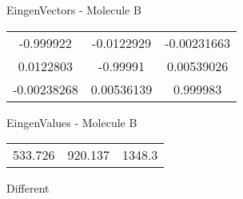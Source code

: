 \begin{multicols}{2}
\begin{center}
\vtab
 EingenVectors - Molecule B     \\
\vtab
\begin{tabular}{|c c c|}
-0.999922	 & 	-0.0122929	 & 	-0.00231663	 \\
0.0122803	 & 	-0.99991	 & 	0.00539026	 \\
-0.00238268	 & 	0.00536139	 & 	0.999983
\end{tabular}

\vtab
 EingenValues - Molecule B     \\
\vtab
\begin{tabular}{|c c c|}
533.726	 & 	920.137	 & 	1348.3	 \\
\end{tabular}

\end{center}
\end{multicols}
\begin{center}
\vtab
\vtab
\textcolor{NavyBlue}{\Large Different}
\end{center}

 \newpage

